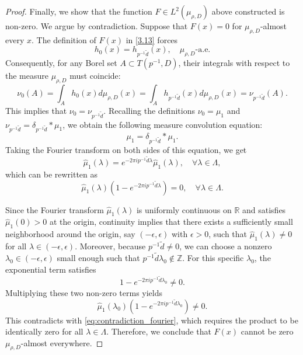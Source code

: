 \documentclass[10pt,a4paper]{amsart}
\begin{document}
\begin{proof}
Finally, we show that the function $F \in L^2(\mu_{\rho,D})$ above constructed is non-zero. We argue by contradiction. Suppose that $F(x) = 0$ for $\mu_{\rho,D}$-almost every $x$. The definition of $F(x)$ in \eqref{3.13} forces 
\begin{equation*}
	h_0(x) = h_{p^{-1}\tilde{d}}(x), \quad \mu_{\rho,D}\text{-a.e.}
\end{equation*}
Consequently, for any Borel set $A \subset T(p^{-1},D)$, their integrals with respect to the measure $\mu_{\rho,D}$ must coincide:
\begin{equation*}
	\nu_0(A) = \int_A h_0(x) d\mu_{\rho,D}(x) = \int_A h_{p^{-1}\tilde{d}}(x) d\mu_{\rho,D}(x) = \nu_{p^{-1}\tilde{d}}(A).
\end{equation*}
This implies that $\nu_0 = \nu_{p^{-1}\tilde{d}}$. Recalling the definitions $\nu_0 = \mu_1$ and $\nu_{p^{-1}\tilde{d}} = \delta_{p^{-1}\tilde{d}} \ast \mu_1$, we obtain the following measure convolution equation:
\begin{equation*}
	\mu_1 = \delta_{p^{-1}\tilde{d}} \ast \mu_1.
\end{equation*}
Taking the Fourier transform on both sides of this equation, we get
\begin{equation*}
	\widehat{\mu}_1(\lambda) = e^{-2\pi i p^{-1}\tilde{d} \lambda} \widehat{\mu}_1(\lambda), \quad \forall \lambda \in \Lambda,
\end{equation*}
which can be rewritten as
\begin{equation} \label{eq:contradiction_fourier}
	\widehat{\mu}_1(\lambda) \left( 1 - e^{-2\pi i p^{-1}\tilde{d} \lambda} \right) = 0, \quad \forall \lambda \in \Lambda.
\end{equation}

Since the Fourier transform $\widehat{\mu}_1(\lambda)$ is uniformly continuous on $\mathbb{R}$ and satisfies $\widehat{\mu}_1(0) > 0$ at the origin, continuity implies that there exists a sufficiently small neighborhood around the origin, say $(-\epsilon, \epsilon)$ with $\epsilon > 0$, such that $\widehat{\mu}_1(\lambda) \neq 0$ for all $\lambda \in (-\epsilon, \epsilon)$.
Moreover, because $p^{-1}\tilde{d} \neq 0$, we can choose a nonzero $\lambda_0 \in (-\epsilon, \epsilon)$ small enough such that $p^{-1}\tilde{d} \lambda_0 \notin \mathbb{Z}$. For this specific $\lambda_0$, the exponential term satisfies
\begin{equation*}
	1 - e^{-2\pi i p^{-1}\tilde{d} \lambda_0} \neq 0.
\end{equation*}
Multiplying these two non-zero terms yields 
\begin{equation*}
	\widehat{\mu}_1(\lambda_0) \left( 1 - e^{-2\pi i p^{-1}\tilde{d} \lambda_0} \right) \neq 0.
\end{equation*}
This  contradicts with  \eqref{eq:contradiction_fourier}, which requires the product to be identically zero for all $\lambda \in \Lambda$.
Therefore, we conclude that $F(x)$ cannot be zero $\mu_{\rho,D}$-almost everywhere. 



\end{proof}
\end{document}
